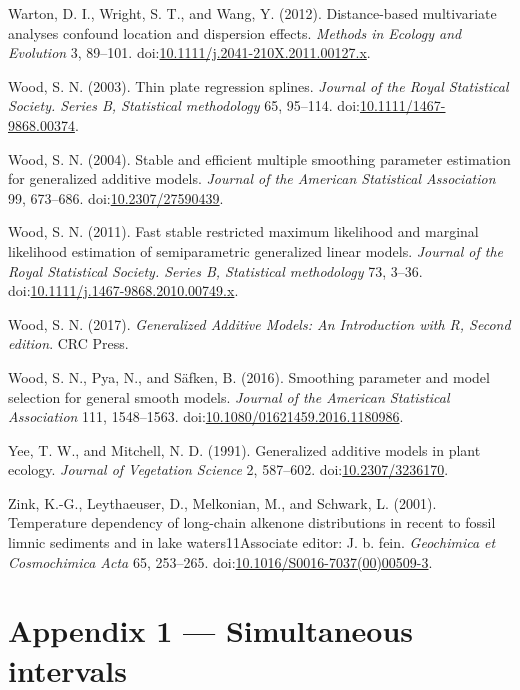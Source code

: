 \documentclass[12pt,]{article}
\begin{document}
\hypertarget{ref-Warton2012-fg}{}
Warton, D. I., Wright, S. T., and Wang, Y. (2012). Distance-based
multivariate analyses confound location and dispersion effects.
\emph{Methods in Ecology and Evolution} 3, 89--101.
doi:\href{https://doi.org/10.1111/j.2041-210X.2011.00127.x}{10.1111/j.2041-210X.2011.00127.x}.

\hypertarget{ref-Wood2003-qy}{}
Wood, S. N. (2003). Thin plate regression splines. \emph{Journal of the
Royal Statistical Society. Series B, Statistical methodology} 65,
95--114.
doi:\href{https://doi.org/10.1111/1467-9868.00374}{10.1111/1467-9868.00374}.

\hypertarget{ref-Wood2004-zv}{}
Wood, S. N. (2004). Stable and efficient multiple smoothing parameter
estimation for generalized additive models. \emph{Journal of the
American Statistical Association} 99, 673--686.
doi:\href{https://doi.org/10.2307/27590439}{10.2307/27590439}.

\hypertarget{ref-Wood2011-kn}{}
Wood, S. N. (2011). Fast stable restricted maximum likelihood and
marginal likelihood estimation of semiparametric generalized linear
models. \emph{Journal of the Royal Statistical Society. Series B,
Statistical methodology} 73, 3--36.
doi:\href{https://doi.org/10.1111/j.1467-9868.2010.00749.x}{10.1111/j.1467-9868.2010.00749.x}.

\hypertarget{ref-Wood2017-qi}{}
Wood, S. N. (2017). \emph{Generalized Additive Models: An Introduction
with R, Second edition}. CRC Press.

\hypertarget{ref-Wood2016-fx}{}
Wood, S. N., Pya, N., and Säfken, B. (2016). Smoothing parameter and
model selection for general smooth models. \emph{Journal of the American
Statistical Association} 111, 1548--1563.
doi:\href{https://doi.org/10.1080/01621459.2016.1180986}{10.1080/01621459.2016.1180986}.

\hypertarget{ref-Yee1991-mg}{}
Yee, T. W., and Mitchell, N. D. (1991). Generalized additive models in
plant ecology. \emph{Journal of Vegetation Science} 2, 587--602.
doi:\href{https://doi.org/10.2307/3236170}{10.2307/3236170}.

\hypertarget{ref-Zink2001-cr}{}
Zink, K.-G., Leythaeuser, D., Melkonian, M., and Schwark, L. (2001).
Temperature dependency of long-chain alkenone distributions in recent to
fossil limnic sediments and in lake waters11Associate editor: J. b.
fein. \emph{Geochimica et Cosmochimica Acta} 65, 253--265.
doi:\href{https://doi.org/10.1016/S0016-7037(00)00509-3}{10.1016/S0016-7037(00)00509-3}.

\hypertarget{appendix}{\section*{Appendix 1 --- Simultaneous
intervals}\label{appendix}}
\end{document}
